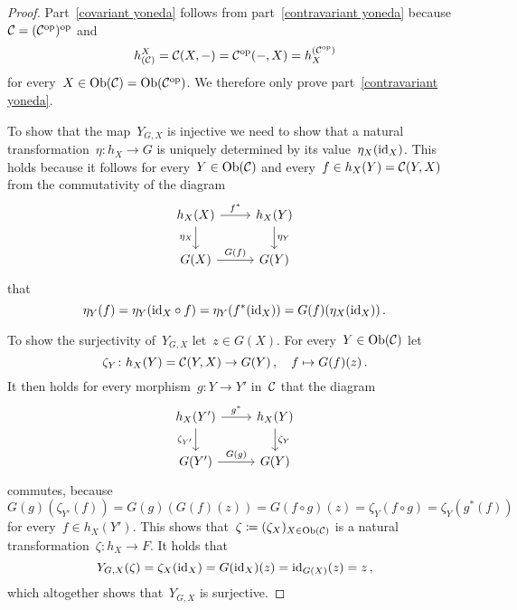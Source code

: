 \begin{proof}
  Part~\ref*{covariant yoneda} follows from part~\ref*{contravariant yoneda} because~$\mathcal{C} = (\mathcal{C}^{\mathrm{op}})^{\mathrm{op}}$ and
  \[
      h^X_{(\mathcal{C})}
    = \mathcal{C}(X,-)
    = \mathcal{C}^{\mathrm{op}}(-,X)
    = h_X^{(\mathcal{C}^{\mathrm{op}})}
  \]
  for every~$X \in \operatorname{Ob}(\mathcal{C}) = \operatorname{Ob}(\mathcal{C}^{\mathrm{op}})$.
  We therefore only prove part~\ref*{contravariant yoneda}.
  
  To show that the map~$Y_{G,X}$ is injective we need to show that a natural transformation~$\eta \colon h_X \to G$ is uniquely determined by its value~$\eta_X(\mathrm{id}_X)$.
  This holds because it follows for every~$Y \in \operatorname{Ob}(\mathcal{C})$ and every~$f \in h_X(Y) = \mathcal{C}(Y,X)$ from the commutativity of the diagram
  \[
    \begin{tikzcd}
        h_X(X)
        \arrow{r}[above]{f^*}
        \arrow{d}[left]{\eta_X}
      & h_X(Y)
        \arrow{d}[right]{\eta_Y}
      \\
        G(X)
        \arrow{r}[above]{G(f)}
      & G(Y)
    \end{tikzcd}
  \]
  that
  \[
      \eta_Y(f)
    = \eta_Y(\mathrm{id}_X \circ f)
    = \eta_Y(f^*(\mathrm{id}_X))
    = G(f)(\eta_X(\mathrm{id}_X)) \,.
  \]
  
  To show the surjectivity of~$Y_{G,X}$ let~$z \in G(X)$.
  For every~$Y \in \operatorname{Ob}(\mathcal{C})$ let
  \[
            \zeta_Y
    \colon  h_X(Y)
    =       \mathcal{C}(Y,X)
    \to     G(Y) \,,
    \quad   f
    \mapsto G(f)(z) \,.
  \]
  It then holds for every morphism~$g \colon Y \to Y'$ in~$\mathcal{C}$ that the diagram
  \[
    \begin{tikzcd}
        h_X(Y')
        \arrow{r}[above]{g^*}
        \arrow{d}[left]{\zeta_{Y'}}
      & h_X(Y)
        \arrow{d}[right]{\zeta_Y}
      \\
        G(Y')
        \arrow{r}[above]{G(g)}
      & G(Y)
    \end{tikzcd}
  \]
  commutes, because
  \[
      G(g)( \zeta_{Y'}( f ) )
    = G(g)( G(f)(z) )
    = G(f \circ g)(z)
    = \zeta_Y(f \circ g)
    = \zeta_Y( g^*(f) )
  \]
  for every~$f \in h_X(Y')$.
  This shows that~$\zeta \coloneqq (\zeta_X)_{X \in \operatorname{Ob}(\mathcal{C})}$ is a natural transformation~$\zeta \colon h_X \to F$.
  It holds that
  \[
      Y_{G,X}(\zeta)
    = \zeta_X(\mathrm{id}_X)
    = G(\mathrm{id}_X)(z)
    = \mathrm{id}_{G(X)}(z)
    = z \,,
  \]
  which altogether shows that~$Y_{G,X}$ is surjective.
\end{proof}







